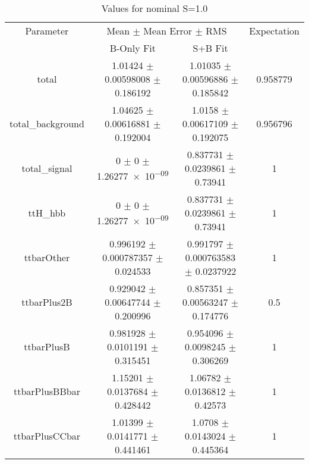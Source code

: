 \begin{table}
\centering
\caption{Values for nominal S=1.0}
\begin{tabular}{cccc}
\toprule
Parameter & \multicolumn{2}{c}{Mean $\pm$ Mean Error $\pm$ RMS} & Expectation\\
 & B-Only Fit & S+B Fit & \\
\midrule
total & \num{1.01424} $\pm$ \num{0.00598008} $\pm$ \num{0.186192} & \num{1.01035} $\pm$ \num{0.00596886} $\pm$ \num{0.185842} & \num{0.958779}\\
total\_background & \num{1.04625} $\pm$ \num{0.00616881} $\pm$ \num{0.192004} & \num{1.0158} $\pm$ \num{0.00617109} $\pm$ \num{0.192075} & \num{0.956796}\\
total\_signal & \num{0} $\pm$ \num{0} $\pm$ \num{1.26277e-09} & \num{0.837731} $\pm$ \num{0.0239861} $\pm$ \num{0.73941} & \num{1}\\
ttH\_hbb & \num{0} $\pm$ \num{0} $\pm$ \num{1.26277e-09} & \num{0.837731} $\pm$ \num{0.0239861} $\pm$ \num{0.73941} & \num{1}\\
ttbarOther & \num{0.996192} $\pm$ \num{0.000787357} $\pm$ \num{0.024533} & \num{0.991797} $\pm$ \num{0.000763583} $\pm$ \num{0.0237922} & \num{1}\\
ttbarPlus2B & \num{0.929042} $\pm$ \num{0.00647744} $\pm$ \num{0.200996} & \num{0.857351} $\pm$ \num{0.00563247} $\pm$ \num{0.174776} & \num{0.5}\\
ttbarPlusB & \num{0.981928} $\pm$ \num{0.0101191} $\pm$ \num{0.315451} & \num{0.954096} $\pm$ \num{0.0098245} $\pm$ \num{0.306269} & \num{1}\\
ttbarPlusBBbar & \num{1.15201} $\pm$ \num{0.0137684} $\pm$ \num{0.428442} & \num{1.06782} $\pm$ \num{0.0136812} $\pm$ \num{0.42573} & \num{1}\\
ttbarPlusCCbar & \num{1.01399} $\pm$ \num{0.0141771} $\pm$ \num{0.441461} & \num{1.0708} $\pm$ \num{0.0143024} $\pm$ \num{0.445364} & \num{1}\\
\bottomrule
\end{tabular}
\end{table}